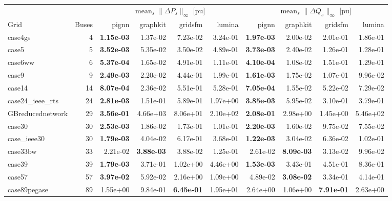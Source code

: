 \documentclass[10pt]{article}
\begin{document}
\begin{table}[H]
\centering\small
\setlength{\tabcolsep}{2.5pt}
\begin{tabular}{lr rrrr rrrr}
\toprule
 & & \multicolumn{4}{c}{$\operatorname{mean}_s\|\Delta P_s\|_\infty$ [pu]} & \multicolumn{4}{c}{$\operatorname{mean}_s\|\Delta Q_s\|_\infty$ [pu]} \\
\cmidrule(lr){3-6}\cmidrule(lr){7-10}
Grid & Buses & pignn & graphkit & gridsfm & lumina & pignn & graphkit & gridsfm & lumina \\
\midrule
case4gs & 4 & \textbf{1.15e-03} & 1.37e-02 & 7.23e-02 & 3.24e-01 & \textbf{1.97e-03} & 2.00e-02 & 2.01e-01 & 1.86e-01 \\
case5 & 5 & \textbf{3.52e-03} & 5.35e-02 & 3.50e-02 & 4.89e-01 & \textbf{3.73e-03} & 2.40e-02 & 1.26e-01 & 1.28e-01 \\
case6ww & 6 & \textbf{5.37e-04} & 1.65e-02 & 4.91e-01 & 1.11e-01 & \textbf{4.10e-04} & 1.08e-02 & 1.51e-01 & 1.29e-01 \\
case9 & 9 & \textbf{2.49e-03} & 2.20e-02 & 4.44e-01 & 1.99e-01 & \textbf{1.61e-03} & 1.75e-02 & 1.07e-01 & 9.96e-02 \\
case14 & 14 & \textbf{8.07e-04} & 2.36e-02 & 5.51e-01 & 5.28e-01 & \textbf{7.05e-04} & 1.55e-02 & 5.22e-02 & 7.29e-02 \\
case24\_ieee\_rts & 24 & \textbf{2.81e-03} & 1.51e-01 & 5.89e-01 & 1.97e+00 & \textbf{3.85e-03} & 5.95e-02 & 3.10e-01 & 3.79e-01 \\
GBreducednetwork & 29 & \textbf{3.56e-01} & 4.66e+03 & 8.06e+01 & 2.10e+02 & \textbf{2.08e-01} & 2.98e+00 & 1.45e+00 & 5.46e+02 \\
case30 & 30 & \textbf{2.53e-03} & 1.86e-02 & 1.73e-01 & 1.01e-01 & \textbf{2.20e-03} & 1.60e-02 & 9.75e-02 & 7.55e-02 \\
case\_ieee30 & 30 & \textbf{1.79e-03} & 4.04e-02 & 6.17e-01 & 3.68e-01 & \textbf{1.22e-03} & 3.04e-02 & 6.36e-02 & 1.02e-01 \\
case33bw & 33 & 2.21e-02 & \textbf{3.88e-03} & 3.88e-02 & 1.25e-01 & 2.61e-02 & \textbf{8.09e-03} & 3.13e-02 & 9.96e-02 \\
case39 & 39 & \textbf{1.79e-03} & 3.71e-01 & 1.02e+00 & 4.46e+00 & \textbf{1.53e-03} & 3.43e-01 & 4.51e-01 & 8.36e-01 \\
case57 & 57 & \textbf{3.97e-02} & 5.92e-02 & 2.16e+00 & 1.09e+00 & 4.89e-02 & \textbf{3.08e-02} & 3.34e-01 & 4.14e-01 \\
case89pegase & 89 & 1.55e+00 & 9.84e-01 & \textbf{6.45e-01} & 1.95e+01 & 2.64e+00 & 1.06e+00 & \textbf{7.91e-01} & 2.63e+00 \\

\end{tabular}
\end{table}
\end{document}
